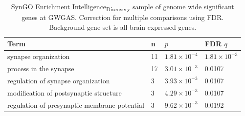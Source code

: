 \begin{table}[]
    \centering
     \setlength{\extrarowheight}{2pt}
    \begin{tabular}{llll}
    \toprule
      Term   & n & $p$ & FDR $q$  \\
      \midrule
       synapse organization&	11&	$1.81\times10^{-4}$&	$1.81\times10^{-3}$\\
process in the synapse&	17&	$3.01\times10^{-3}$&	0.0107\\
regulation of synapse organization&	3&	$3.93\times10^{-3}$&	0.0107\\
modification of postsynaptic structure&	3	&$4.29\times10^{-3}$	&0.0107\\
regulation of presynaptic membrane potential&	3&$9.62\times10^{-3}$&	0.0192  \\ 
\bottomrule
    \end{tabular}
    \caption[SynGO Ontology enrichment Intelligence Discovery]{SynGO Enrichment Intelligence\textsubscript{Discovery} sample of genome wide significant genes at GWGAS. Correction for multiple comparisons using FDR. Background gene set is all brain expressed genes.}
    \label{tab:SynGO Enrichment UKBB intelligence significant genes. FDR}
\end{table}




   
